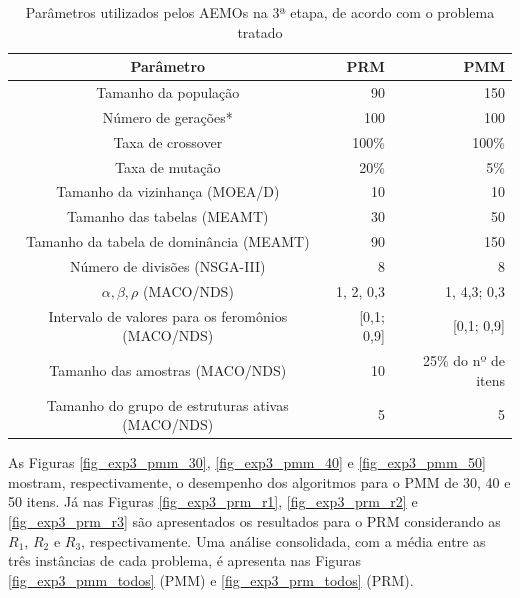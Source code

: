 \begin{table}[!htbp]
	\caption{Parâmetros utilizados pelos AEMOs na 3ª etapa, de acordo com o problema tratado}
	\label{table_exp3_parametros}
	\begin{center}
		\begin{tabular}{c|r|r}
			\textbf{Parâmetro} & \textbf{PRM} &  \textbf{PMM} \\ %
			\hline
			Tamanho da população               &    90 &      150 \\ %
			Número de gerações*        &   100 &      100 \\ %
			Taxa de crossover                & 100\% &    100\% \\ %
			Taxa de mutação                 &  20\% &      5\% \\ %
			Tamanho da vizinhança (MOEA/D)    &    10 &       10 \\ %
			Tamanho das tabelas (MEAMT)   &    30 &       50 \\ %
			Tamanho da tabela de dominância (MEAMT) &    90 &      150 \\ %
			Número de divisões (NSGA-III)&     8 &        8 \\ %
			$\alpha, \beta, \rho$ (MACO/NDS)& 1, 2, 0,3 & 1, 4,3; 0,3 \\ %
			Intervalo de valores para os feromônios (MACO/NDS)& [0,1; 0,9] & [0,1; 0,9] \\ %
			Tamanho das amostras (MACO/NDS)& 10 &25\% do nº de itens \\  %
			Tamanho do grupo de estruturas ativas (MACO/NDS)& 5 & 5 \\
			\hline
		\end{tabular}
	\end{center}
\end{table}

As Figuras \ref{fig_exp3_pmm_30}, \ref{fig_exp3_pmm_40} e \ref{fig_exp3_pmm_50} mostram, respectivamente, o desempenho dos algoritmos para o PMM de 30, 40 e 50 itens. Já nas Figuras \ref{fig_exp3_prm_r1}, \ref{fig_exp3_prm_r2} e \ref{fig_exp3_prm_r3} são apresentados os resultados para o PRM considerando as $R_1$, $R_2$ e $R_3$, respectivamente. Uma análise consolidada, com a média entre as três instâncias de cada problema, é apresenta nas Figuras \ref{fig_exp3_pmm_todos} (PMM) e \ref{fig_exp3_prm_todos} (PRM).


